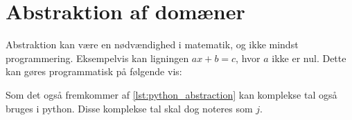 \section{Abstraktion af domæner}
Abstraktion kan være en nødvændighed i matematik, og ikke mindst programmering.
Eksempelvis kan ligningen $ax+b=c$, hvor $a$ ikke er nul.
Dette kan gøres programmatisk på følgende vis:

Som det også fremkommer af \cref{lst:python_abstraction} kan komplekse tal også bruges i python.
Disse komplekse tal skal dog noteres som $j$.
